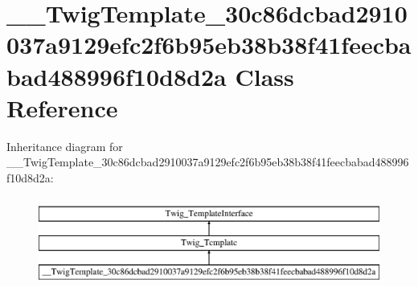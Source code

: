 \hypertarget{class_____twig_template__30c86dcbad2910037a9129efc2f6b95eb38b38f41feecbabad488996f10d8d2a}{}\section{\+\_\+\+\_\+\+Twig\+Template\+\_\+30c86dcbad2910037a9129efc2f6b95eb38b38f41feecbabad488996f10d8d2a Class Reference}
\label{class_____twig_template__30c86dcbad2910037a9129efc2f6b95eb38b38f41feecbabad488996f10d8d2a}
Inheritance diagram for \+\_\+\+\_\+\+Twig\+Template\+\_\+30c86dcbad2910037a9129efc2f6b95eb38b38f41feecbabad488996f10d8d2a\+:\begin{figure}[H]
\begin{center}
\leavevmode
\includegraphics[height=3.000000cm]{class_____twig_template__30c86dcbad2910037a9129efc2f6b95eb38b38f41feecbabad488996f10d8d2a}
\end{center}
\end{figure}
